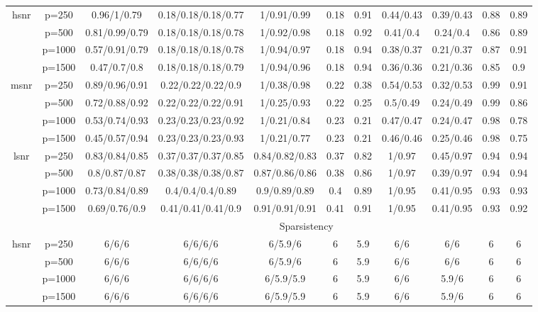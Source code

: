 \begin{table}[ht]
{\begin{tabular}{|c|c|ccccccccc|}
\midrule\multirow{4}[2]{*}{hsnr} & p=250 & 0.96/1/0.79 & 0.18/0.18/0.18/0.77 & 1/0.91/0.99 & 0.18 & 0.91 & 0.44/0.43 & 0.39/0.43 & 0.88 & 0.89 \\ 
   & p=500 & 0.81/0.99/0.79 & 0.18/0.18/0.18/0.78 & 1/0.92/0.98 & 0.18 & 0.92 & 0.41/0.4 & 0.24/0.4 & 0.86 & 0.89 \\ 
   & p=1000 & 0.57/0.91/0.79 & 0.18/0.18/0.18/0.78 & 1/0.94/0.97 & 0.18 & 0.94 & 0.38/0.37 & 0.21/0.37 & 0.87 & 0.91 \\ 
   & p=1500 & 0.47/0.7/0.8 & 0.18/0.18/0.18/0.79 & 1/0.94/0.96 & 0.18 & 0.94 & 0.36/0.36 & 0.21/0.36 & 0.85 & 0.9 \\ 
  \midrule\multirow{4}[2]{*}{msnr} & p=250 & 0.89/0.96/0.91 & 0.22/0.22/0.22/0.9 & 1/0.38/0.98 & 0.22 & 0.38 & 0.54/0.53 & 0.32/0.53 & 0.99 & 0.91 \\ 
   & p=500 & 0.72/0.88/0.92 & 0.22/0.22/0.22/0.91 & 1/0.25/0.93 & 0.22 & 0.25 & 0.5/0.49 & 0.24/0.49 & 0.99 & 0.86 \\ 
   & p=1000 & 0.53/0.74/0.93 & 0.23/0.23/0.23/0.92 & 1/0.21/0.84 & 0.23 & 0.21 & 0.47/0.47 & 0.24/0.47 & 0.98 & 0.78 \\ 
   & p=1500 & 0.45/0.57/0.94 & 0.23/0.23/0.23/0.93 & 1/0.21/0.77 & 0.23 & 0.21 & 0.46/0.46 & 0.25/0.46 & 0.98 & 0.75 \\ 
  \midrule\multirow{4}[2]{*}{lsnr} & p=250 & 0.83/0.84/0.85 & 0.37/0.37/0.37/0.85 & 0.84/0.82/0.83 & 0.37 & 0.82 & 1/0.97 & 0.45/0.97 & 0.94 & 0.94 \\ 
   & p=500 & 0.8/0.87/0.87 & 0.38/0.38/0.38/0.87 & 0.87/0.86/0.86 & 0.38 & 0.86 & 1/0.97 & 0.39/0.97 & 0.94 & 0.94 \\ 
   & p=1000 & 0.73/0.84/0.89 & 0.4/0.4/0.4/0.89 & 0.9/0.89/0.89 & 0.4 & 0.89 & 1/0.95 & 0.41/0.95 & 0.93 & 0.93 \\ 
   & p=1500 & 0.69/0.76/0.9 & 0.41/0.41/0.41/0.9 & 0.91/0.91/0.91 & 0.41 & 0.91 & 1/0.95 & 0.41/0.95 & 0.93 & 0.92 \\ 
   \midrule 
 \multicolumn{1}{|c}{} &       & \multicolumn{9}{c|}{Sparsistency} \\
\midrule\multirow{4}[2]{*}{hsnr} & p=250 & 6/6/6 & 6/6/6/6 & 6/5.9/6 & 6 & 5.9 & 6/6 & 6/6 & 6 & 6 \\ 
   & p=500 & 6/6/6 & 6/6/6/6 & 6/5.9/6 & 6 & 5.9 & 6/6 & 6/6 & 6 & 6 \\ 
   & p=1000 & 6/6/6 & 6/6/6/6 & 6/5.9/5.9 & 6 & 5.9 & 6/6 & 5.9/6 & 6 & 6 \\ 
   & p=1500 & 6/6/6 & 6/6/6/6 & 6/5.9/5.9 & 6 & 5.9 & 6/6 & 5.9/6 & 6 & 6 \\ 

\end{tabular}}
\end{table}
